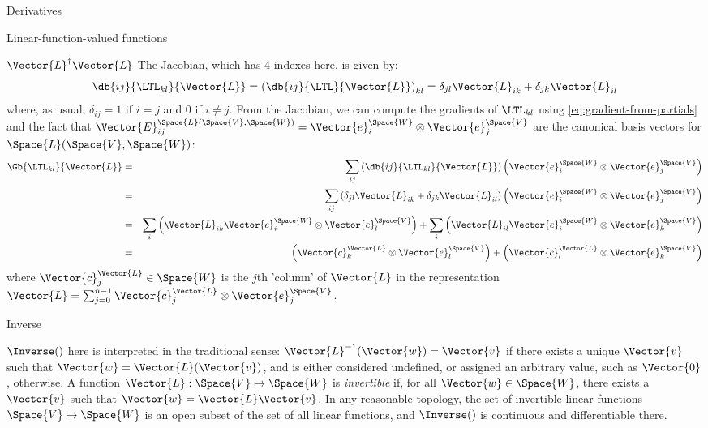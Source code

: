 \begin{plSection}{Derivatives}
\begin{plSection}{Linear-function-valued functions}
\begin{plSection}{\texorpdfstring{$\Vector{L}^{\dagger} \Vector{L}$}{LTL}}
The Jacobian, which has 4 indexes here, is given by:
\begin{equation}
\db{ij}{\LTL_{kl}}{\Vector{L}}
 =
\left( \db{ij}{\LTL}{\Vector{L}} \right)_{kl}
=
\delta_{jl} \Vector{L}_{ik}
+
\delta_{jk} \Vector{L}_{il}
\end{equation}
where, as usual, $\delta_{ij} = 1$ if $i=j$ and  $0$ if $i \neq j$.
From the Jacobian, we can compute the gradients of $\LTL_{kl}$
using \cref{eq:gradient-from-partials}
and the fact that
$\Vector{E}_{ij}^{\Space{L}(\Space{V},\Space{W})}  = \Vector{e}_i^{\Space{W}} \otimes \Vector{e}_j^{\Space{V}}$
are the canonical basis vectors for $\Space{L}(\Space{V},\Space{W})$:
\begin{eqnarray}
\Gb{\LTL_{kl}}{\Vector{L}}
& = &
\sum_{ij}
\left( \db{ij}{\LTL_{kl}}{\Vector{L}} \right)
\left( \Vector{e}_i^{\Space{W}} \otimes \Vector{e}_j^{\Space{V}} \right)
\\
& = &
\sum_{ij}
\left( \delta_{jl} \Vector{L}_{ik} + \delta_{jk} \Vector{L}_{il} \right)
\left( \Vector{e}_i^{\Space{W}} \otimes \Vector{e}_j^{\Space{V}} \right)
\nonumber
\\
& = &
\sum_{i}
\left(
\Vector{L}_{ik}  \Vector{e}_i^{\Space{W}} \otimes \Vector{e}_l^{\Space{V}}
\right)
+
\sum_{i}
\left(
\Vector{L}_{il}  \Vector{e}_i^{\Space{W}} \otimes \Vector{e}_k^{\Space{V}}
\right)
\nonumber
\\
& = &
\left(
\Vector{c}_k^{\Vector{L}} \otimes \Vector{e}_l^{\Space{V}}
\right)
+
\left(
\Vector{c}_l^{\Vector{L}} \otimes \Vector{e}_k^{\Space{V}}
\right)
\nonumber
\end{eqnarray}
where $\Vector{c}_j^{\Vector{L}} \in \Space{W}$ is the $j$th 'column' of $\Vector{L}$
in the representation
$\Vector{L} = \sum_{j=0}^{n-1} \Vector{c}_j^{\Vector{L}} \otimes \Vector{e}_j^{\Space{V}}$.

\end{plSection}%
\begin{plSection}{Inverse}
\label{sec:Derivative-of-inverse}

$\Inverse()$ here is interpreted in the traditional sense:
$\Vector{L}^{-1}(\Vector{w}) = \Vector{v}$ if there exists a unique $\Vector{v}$ such that $\Vector{w} = \Vector{L}(\Vector{v})$,
and is either considered undefined, or assigned an arbitrary
value, such as $\Vector{0}$, otherwise.
A function $\Vector{L} : \Space{V} \mapsto \Space{W}$ is \textit{invertible}
if, for all $\Vector{w} \in \Space{W}$, there exists a $\Vector{v}$ such that
$\Vector{w} = \Vector{L} \Vector{v}$.
In any reasonable topology,
the set of invertible linear functions $\Space{V} \mapsto \Space{W}$
is an open subset of the set of all linear functions,
and $\Inverse()$ is continuous and differentiable there.


\end{plSection}
\end{plSection}
\end{plSection}
